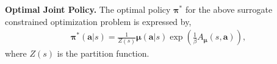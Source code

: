 \documentclass[11pt]{article}
\theoremstyle{plain}
\theoremstyle{remark}
\begin{document}

\textbf{Optimal Joint Policy.} The optimal policy $\boldsymbol{\pi}^{*}$ for the above surrogate constrained optimization problem is expressed by,
\begin{align}
\label{equ:optimal_1}
\boldsymbol{\pi}^{*}(\boldsymbol{a}|s) = \frac{1}{Z(s)}\boldsymbol{\mu}(\boldsymbol{a}|s)\exp\left(\frac{1}{\beta}A_{\boldsymbol{\mu}}(s, \boldsymbol{a})\right),
\end{align}
where $Z(s)$ is the partition function.
\end{document}
